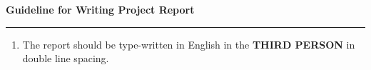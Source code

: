 
\begingroup 
\small            %
\parskip=0pt      %
\linespread{1.0}\selectfont  %
\vspace*{-2.5cm}
\begin{center}
	{\Large \textbf{Guideline for Writing Project Report}} \\[0.5em]
	\vspace{-1.5em}
	\rule{}{1pt}
\end{center}
\begin{enumerate}[nosep, leftmargin=*] %
	\item The report should be type-written in English in the \textbf{THIRD PERSON} in double line spacing.
	

\end{enumerate}
